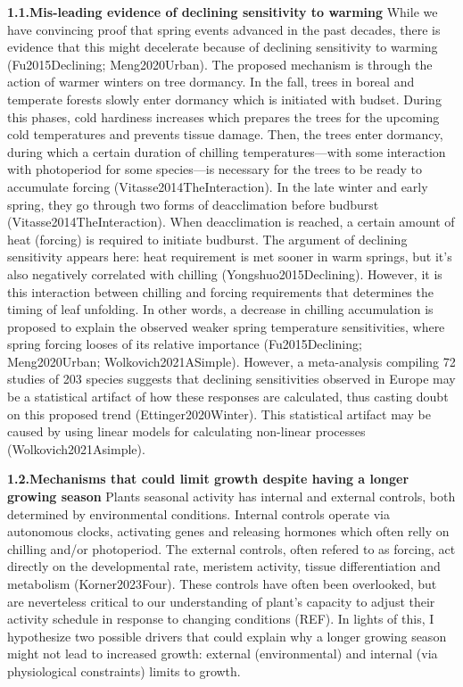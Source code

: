 \documentclass{article}
\begin{document}
\textbf{1.1.Mis-leading evidence of declining sensitivity to warming}
While we have convincing proof that spring events advanced in the past decades, there is evidence that this might decelerate because of declining sensitivity to warming (Fu2015Declining; Meng2020Urban). The proposed mechanism is through the action of warmer winters on tree dormancy. In the fall, trees in boreal and temperate forests slowly enter dormancy which is initiated with budset. During this phases, cold hardiness increases which prepares the trees for the upcoming cold temperatures and prevents tissue damage. Then, the trees enter dormancy, during which a certain duration of chilling temperatures---with some interaction with photoperiod for some species---is necessary for the trees to be ready to accumulate forcing (Vitasse2014TheInteraction). In the late winter and early spring, they go through two forms of deacclimation before budburst (Vitasse2014TheInteraction). When deacclimation is reached, a certain amount of heat (forcing) is required to initiate budburst. The argument of declining sensitivity appears here: heat requirement is met sooner in warm springs, but it's also negatively correlated with chilling (Yongshuo2015Declining). However, it is this interaction between chilling and forcing requirements that determines the timing of leaf unfolding. In other words, a decrease in chilling accumulation is proposed to explain the observed weaker spring temperature sensitivities, where spring forcing looses of its relative importance (Fu2015Declining; Meng2020Urban; Wolkovich2021ASimple). However, a meta-analysis compiling 72 studies of 203 species suggests that declining sensitivities observed in Europe may be a statistical artifact of how these responses are calculated, thus casting doubt on this proposed trend (Ettinger2020Winter). This statistical artifact may be caused by using linear models for calculating non-linear processes (Wolkovich2021Asimple).

\textbf{1.2.Mechanisms that could limit growth despite having a longer growing season}
Plants seasonal activity has internal and external controls, both determined by environmental conditions. Internal controls operate via autonomous clocks, activating genes and releasing hormones which often relly on chilling and/or photoperiod. The external controls, often refered to as forcing, act directly on the developmental rate, meristem activity, tissue differentiation and metabolism (Korner2023Four). These controls have often been overlooked, but are neverteless critical to our understanding of plant's capacity to adjust their activity schedule in response to changing conditions (REF). In lights of this, I hypothesize two possible drivers that could explain why a longer growing season might not lead to increased growth: external (environmental) \cite{kolar_response_2016} and internal (via physiological constraints)\cite{zohner_effect_2023} limits to growth. 
\end{document}
